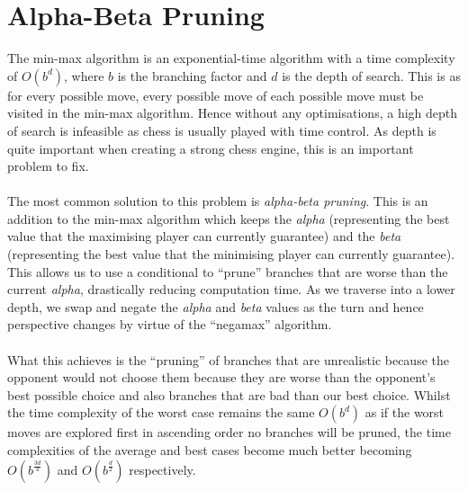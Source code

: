 \section{Alpha-Beta Pruning}
The min-max algorithm is an exponential-time algorithm with a time complexity of $O(b^d)$, where $b$ is the branching factor and $d$ is the depth of search. This is as for every possible move, every possible move of each possible move must be visited in the min-max algorithm. Hence without any optimisations, a high depth of search is infeasible as chess is usually played with time control. As depth is quite important when creating a strong chess engine, this is an important problem to fix.\\\\
The most common solution to this problem is \textit{alpha-beta pruning}. This is an addition to the min-max algorithm which keeps the \textit{alpha} (representing the best value that the maximising player can currently guarantee) and the \textit{beta} (representing the best value that the minimising player can currently guarantee). This allows us to use a conditional to ``prune'' branches that are worse than the current \textit{alpha}, drastically reducing computation time. As we traverse into a lower depth, we swap and negate the \textit{alpha} and \textit{beta} values as the turn and hence perspective changes by virtue of the ``negamax'' algorithm.\\\\
What this achieves is the ``pruning'' of branches that are unrealistic because the opponent would not choose them because they are worse than the opponent's best possible choice and also branches that are bad than our best choice. Whilst the time complexity of the worst case remains the same $O(b^d)$ as if the worst moves are explored first in ascending order no branches will be pruned, the time complexities of the average and best cases become much better becoming $O(b^{\frac{3d}{4}})$ and $O(b^{\frac{d}{2}})$ respectively. 
